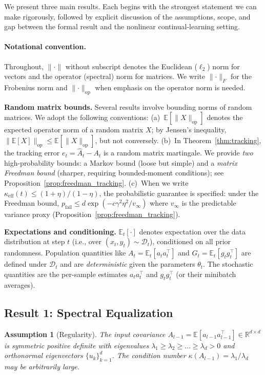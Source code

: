 \documentclass{article}
\providecommand{\R}{\mathbb{R}}
\providecommand{\E}{\mathbb{E}}
\providecommand{\norm}[1]{\lVert #1 \rVert}
\theoremstyle{plain}
\newtheorem{assumption}{Assumption}
\theoremstyle{definition}
\theoremstyle{remark}
\begin{document}
We present three main results. Each begins with the strongest statement we can make rigorously, followed by explicit discussion of the assumptions, scope, and gap between the formal result and the nonlinear continual-learning setting.

\paragraph{Notational convention.} Throughout, $\norm{\cdot}$ without subscript denotes the Euclidean ($\ell_2$) norm for vectors and the operator (spectral) norm for matrices. We write $\norm{\cdot}_F$ for the Frobenius norm and $\norm{\cdot}_{\mathrm{op}}$ when emphasis on the operator norm is needed.

\textbf{Random matrix bounds.} Several results involve bounding norms of random matrices. We adopt the following conventions: (a)~$\E[\norm{X}_{\mathrm{op}}]$ denotes the expected operator norm of a random matrix $X$; by Jensen's inequality, $\norm{\E[X]}_{\mathrm{op}} \leq \E[\norm{X}_{\mathrm{op}}]$, but not conversely. (b)~In Theorem~\ref{thm:tracking}, the tracking error $e_t = \hat{A}_t - A_t$ is a random matrix martingale. We provide \emph{two} high-probability bounds: a Markov bound (loose but simple) and a \emph{matrix Freedman bound} (sharper, requiring bounded-moment conditions); see Proposition~\ref{prop:freedman_tracking}. (c)~When we write $\kappa_{\mathrm{eff}}(t) \leq (1+\eta)/(1-\eta)$, the probabilistic guarantee is specified: under the Freedman bound, $p_{\mathrm{fail}} \leq d \exp(-c\gamma^2\eta^2/v_\infty)$ where $v_\infty$ is the predictable variance proxy (Proposition~\ref{prop:freedman_tracking}).

\textbf{Expectations and conditioning.} $\E_t[\cdot]$ denotes expectation over the data distribution at step $t$ (i.e., over $(x_t, y_t) \sim \mathcal{D}_t$), conditioned on all prior randomness. Population quantities like $A_t = \E_t[a_t a_t^\top]$ and $G_t = \E_t[g_t g_t^\top]$ are defined under $\mathcal{D}_t$ and are \emph{deterministic} given the parameters $\theta_t$. The stochastic quantities are the per-sample estimates $a_t a_t^\top$ and $g_t g_t^\top$ (or their minibatch averages).

\subsection{Result 1: Spectral Equalization}
\label{sec:spectral}

\begin{assumption}[Regularity]
\label{ass:regularity}
The input covariance $A_{l-1} = \E[a_{l-1}a_{l-1}^\top] \in \R^{d \times d}$ is symmetric positive definite with eigenvalues $\lambda_1 \geq \lambda_2 \geq \ldots \geq \lambda_d > 0$ and orthonormal eigenvectors $\{u_k\}_{k=1}^d$. The condition number $\kappa(A_{l-1}) = \lambda_1/\lambda_d$ may be arbitrarily large.
\end{assumption}
\end{document}
